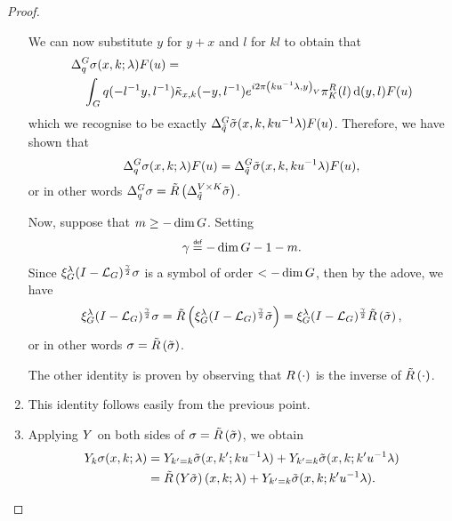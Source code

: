 \begin{proof}
\begin{enumerate}
            We can now substitute $y$ for $y + x$ and $l$ for $k l$ to obtain that
            \begin{align*}
                &\DifferenceOperator{q} \sigma(x, k; \lambda) F(u) =\\
                &\quad \int_\Group q(-l^{-1} y, l^{-1}) \tilde \kappa_{x, k}(-y, l^{-1}) \e^{\i \turn \ip {k u^{-1} \lambda} y} \RightRegularRepresentation(l) \dd (y, l) F(u)
            \end{align*}
            which we recognise to be exactly $\DifferenceOperator {\tilde q} \tilde \sigma(x, k, k u^{-1} \lambda) F(u)$.
            Therefore, we have shown that
            \begin{align*}
                \DifferenceOperator{q} \sigma(x, k; \lambda) F(u)
                = \DifferenceOperator {\tilde q} \tilde \sigma(x, k, k u^{-1} \lambda) F(u),
            \end{align*}
            or in other words $\DifferenceOperator q \sigma = \Rotation {\DifferenceOperator[\GroupDirect] {\tilde q} \tilde \sigma}$.

            Now, suppose that $m \geq -\dim \Group$.
            Setting
            \begin{align*}
                \gamma \defeq -\dim \Group - 1 - m.
            \end{align*}
            Since $\Rep \lambda \BesselPotential \gamma \sigma$ is a symbol of order $< -\dim \Group$,
            then by the adove, we have
            \begin{align*}
                \Rep \lambda \BesselPotential \gamma \sigma
                = \Rotation {\Rep \lambda \BesselPotential \gamma \tilde \sigma}
                = \Rep \lambda \BesselPotential \gamma \Rotation {\tilde \sigma},
            \end{align*}
            or in other words $\sigma = \Rotation {\tilde \sigma}$.

            The other identity is proven by observing that $\InverseRotation \dummy$ is the inverse of $\Rotation \dummy$.
        \item
            This identity follows easily from the previous point.
        \item
            Applying $\LeftDifferentialOperatorFirstOrder Y$ on both sides of $\sigma = \Rotation {\tilde \sigma}$,
            we obtain
            \begin{align}
                \LeftDifferentialOperatorFirstOrder Y_k \sigma(x, k; \lambda)
                &= \LeftDifferentialOperatorFirstOrder Y_{k' = k} \tilde \sigma(x, k'; k u^{-1} \lambda) + \LeftDifferentialOperatorFirstOrder Y_{k' = k} \tilde \sigma(x, k; k' u^{-1} \lambda)\\
                &= \Rotation {\LeftDifferentialOperatorFirstOrder Y \tilde \sigma}(x, k; \lambda) + \LeftDifferentialOperatorFirstOrder Y_{k' = k} \tilde \sigma(x, k; k' u^{-1} \lambda).
                \label{eq:Y_derivative_of_rotated_symbol_on_direct_product}
            \end{align}


\end{enumerate}
\end{proof}

